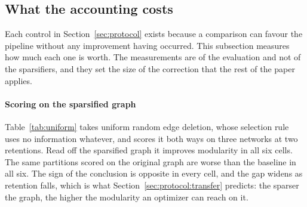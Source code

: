 %
%

\subsection{What the accounting costs}\label{sec:experiments:accounting}

Each control in Section~\ref{sec:protocol} exists because a comparison can favour
the pipeline without any improvement having occurred. This subsection measures
how much each one is worth. The measurements are of the evaluation and not of the
sparsifiers, and they set the size of the correction that the rest of the paper
applies.

\paragraph{Scoring on the sparsified graph}
Table~\ref{tab:uniform} takes uniform random edge deletion, whose selection rule
uses no information whatever, and scores it both ways on three networks at two
retentions. Read off the sparsified graph it improves modularity in all six
cells. The same partitions scored on the original graph are worse than the
baseline in all six. The sign of the conclusion is opposite in every cell, and
the gap widens as retention falls, which is what
Section~\ref{sec:protocol:transfer} predicts: the sparser the graph, the higher
the modularity an optimizer can reach on it.

